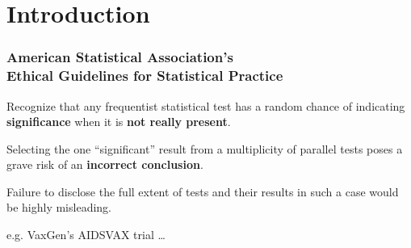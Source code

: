 \documentclass[xcolor={dvipsnames}]{beamer}
\begin{document}
\begin{frame}
\begin{minipage}[t]{0.45\textwidth}
\end{minipage}
\end{frame}

\section{Introduction}

\begin{frame}
\frametitle{American Statistical Association's\\
Ethical Guidelines for Statistical Practice}

Recognize that any frequentist %
statistical test has a random %
chance of indicating \textbf{significance} %
when it is \textbf{not really present}. %
\bigskip

Selecting the one ``significant'' %
result from a multiplicity of parallel  %
tests poses a grave risk of an  %
\textbf{incorrect conclusion}.   %
\bigskip

Failure to disclose the full extent %
of tests and their results in such  %
a case would be highly misleading. %
\pause

\bigskip
e.g. VaxGen's AIDSVAX trial \ldots
\end{frame}
\end{document}
